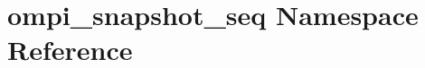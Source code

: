 \hypertarget{namespaceompi__snapshot__seq}{\section{ompi\-\_\-snapshot\-\_\-seq Namespace Reference}
\label{namespaceompi__snapshot__seq}
}
